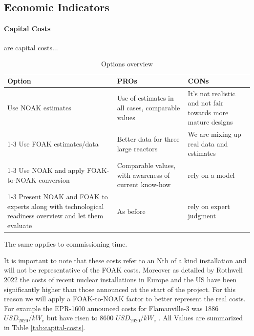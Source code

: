 \subsection{Economic Indicators}

\paragraph{Capital Costs} are capital costs...

\begin{table}[!hb]
    \centering
    \begin{tabularx}{\textwidth}{X X X}
        \toprule
        \textbf{Option} & \textbf{PROs} & \textbf{CONs}\\
        \midrule
        Use NOAK estimates          & Use of estimates in all cases, comparable values & It's not realistic and not fair towards more mature designs \\
        \cmidrule(lr){1-3}
        Use FOAK estimates/data        & Better data for three large reactors & We are mixing up real data and estimates \\
        \cmidrule(lr){1-3}
        Use NOAK and apply FOAK-to-NOAK conversion         & Comparable values, with awareness of current know-how & rely on a model \\
        \cmidrule(lr){1-3}
        Present NOAK and FOAK to experts along with technological readiness overview and let them evaluate &  As before & rely on expert judgment \\
        \bottomrule
    \end{tabularx}
    \caption{Options overview}
\end{table}

The same applies to commissioning time.

It is important to note that these costs refer to an Nth of a kind installation and will not be representative of the FOAK costs. Moreover as detailed by Rothwell 2022 \cite{ROTHWELL2022112905} the costs of recent nuclear installations in Europe and the US have been significantly higher than those announced at the start of the project. For this reason we will apply a FOAK-to-NOAK factor to better represent the real costs. For example the EPR-1600 announced costs for Flamanville-3 was 1886 $USD_{2020}/kW_e$ but have risen to 8600 $USD_{2020}/kW_e$ \cite{NEA2020}. All Values are summarized in Table \ref{tab:capital-costs}. \\

